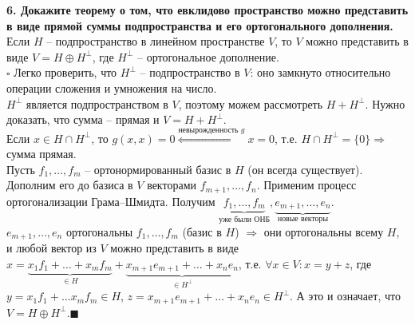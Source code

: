 \documentclass[11pt,a4paper]{article}
\newcommand{\proof}{$\square$ }
\newcommand{\qed}{\hfill$\blacksquare$}
\begin{document}
\textbf{6. Докажите теорему о том, что евклидово пространство можно представить в виде прямой суммы подпространства и его ортогонального дополнения.\\}
Если $H$ -- подпространство в линейном пространстве $V$, то $V$ можно представить в виде $V = H \oplus H^\perp$, где $H^\perp$ -- ортогональное дополнение.\\
\proof Легко проверить, что $H^\perp$ -- подпространство в $V$: оно замкнуто относительно операции сложения и умножения на число.\\
$H^\perp$ является подпространством в $V$, поэтому можем рассмотреть $H + H^\perp$. Нужно доказать, что сумма -- прямая и $V = H + H^\perp$.\\
Если $x \in H \cap H^\perp$, то $g(x, x) = 0 \stackrel{\text{невырожденность } g}{\Leftrightarrow} x = 0$, т.е. $H \cap H^\perp = \{0\} \Rightarrow$ сумма прямая.\\
Пусть $f_1, \hdots, f_m$ -- ортонормированный базис в $H$ (он всегда существует). Дополним его до базиса в $V$ векторами $f_{m+1}, \hdots, f_n$. Применим процесс ортогонализации Грама--Шмидта. Получим $\underbrace{f_1, \hdots, f_m}_{\text{уже были ОНБ}}, \underbrace{e_{m+1}, \hdots, e_n}_{\text{новые векторы}}$.\\
$e_{m+1}, \hdots, e_n$ ортогональны $f_1, \hdots, f_m$ (базис в $H$) $\Rightarrow$ они ортогональны всему $H$, и любой вектор из $V$ можно представить в виде $x = \underbrace{x_1 f_1 + \hdots + x_m f_m}_{\in H} + \underbrace{x_{m+1}e_{m+1} + \hdots + x_n e_n}_{\in H^\perp}$, т.е. $\forall x \in V: x = y + z$, где $y = x_1 f_1 + \hdots x_m f_m \in H$, $z = x_{m+1} e_{m+1} + \hdots + x_n e_n \in H^\perp$. А это и означает, что $V = H \oplus H^\perp$.\qed
\end{document}
